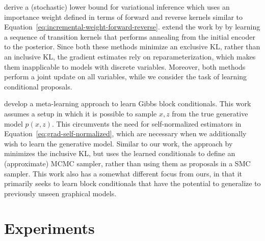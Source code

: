 \documentclass{article}
\theoremstyle{definition}
\begin{document}
\citet{salimans2015markov} derive a (stochastic) lower bound for variational inference which uses an importance weight defined in terms of forward and reverse kernels similar to Equation~\ref{eq:incremental-weight-forward-reverse}.
\citet{huang2018improving} extend the work by \citet{salimans2015markov} by learning a sequence of transition kernels that performs annealing from the initial encoder to the posterior. 
Since both these methods minimize an exclusive KL, rather than an inclusive KL, the gradient estimates rely on reparameterization, which makes them inapplicable to models with discrete variables. 
Moreover, both methods perform a joint update on all variables, while we consider the task of learning conditional proposals.

\citet{wang2018meta} develop a meta-learning approach to learn Gibbs block conditionals. This work assumes a setup in which it is possible to sample $x, z$ from the true generative model $p(x,z)$. This circumvents the need for self-normalized estimators in Equation~\ref{eq:grad-self-normalized}, which are necessary when we additionally wish to learn the generative model. Similar to our work, the approach by \citet{wang2018meta} minimizes the inclusive KL, but uses the learned conditionals to define an (approximate) MCMC sampler, rather than using them as proposals in a SMC sampler. This work also has a somewhat different focus from ours, in that it primarily seeks to learn block conditionals that have the potential to generalize to previously unseen graphical models.


\vspace{-0.25em}
\section{Experiments}
\label{sec:experiments}
\end{document}
